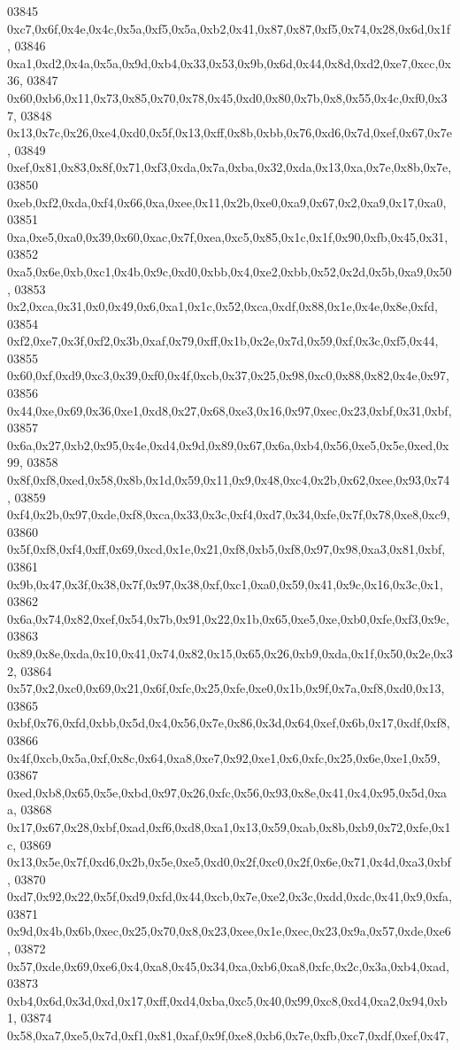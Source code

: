 \begin{DoxyCode}
03845   0xc7,0x6f,0x4e,0x4c,0x5a,0xf5,0x5a,0xb2,0x41,0x87,0x87,0xf5,0x74,0x28,0x6d,0x1f,
03846   0xa1,0xd2,0x4a,0x5a,0x9d,0xb4,0x33,0x53,0x9b,0x6d,0x44,0x8d,0xd2,0xe7,0xcc,0x36,
03847   0x60,0xb6,0x11,0x73,0x85,0x70,0x78,0x45,0xd0,0x80,0x7b,0x8,0x55,0x4c,0xf0,0x37,
03848   0x13,0x7c,0x26,0xe4,0xd0,0x5f,0x13,0xff,0x8b,0xbb,0x76,0xd6,0x7d,0xef,0x67,0x7e,
03849   0xef,0x81,0x83,0x8f,0x71,0xf3,0xda,0x7a,0xba,0x32,0xda,0x13,0xa,0x7e,0x8b,0x7e,
03850   0xeb,0xf2,0xda,0xf4,0x66,0xa,0xee,0x11,0x2b,0xe0,0xa9,0x67,0x2,0xa9,0x17,0xa0,
03851   0xa,0xe5,0xa0,0x39,0x60,0xac,0x7f,0xea,0xc5,0x85,0x1c,0x1f,0x90,0xfb,0x45,0x31,
03852   0xa5,0x6e,0xb,0xc1,0x4b,0x9c,0xd0,0xbb,0x4,0xe2,0xbb,0x52,0x2d,0x5b,0xa9,0x50,
03853   0x2,0xca,0x31,0x0,0x49,0x6,0xa1,0x1c,0x52,0xca,0xdf,0x88,0x1e,0x4e,0x8e,0xfd,
03854   0xf2,0xe7,0x3f,0xf2,0x3b,0xaf,0x79,0xff,0x1b,0x2e,0x7d,0x59,0xf,0x3c,0xf5,0x44,
03855   0x60,0xf,0xd9,0xc3,0x39,0xf0,0x4f,0xcb,0x37,0x25,0x98,0xc0,0x88,0x82,0x4e,0x97,
03856   0x44,0xe,0x69,0x36,0xe1,0xd8,0x27,0x68,0xe3,0x16,0x97,0xec,0x23,0xbf,0x31,0xbf,
03857   0x6a,0x27,0xb2,0x95,0x4e,0xd4,0x9d,0x89,0x67,0x6a,0xb4,0x56,0xe5,0x5e,0xed,0x99,
03858   0x8f,0xf8,0xed,0x58,0x8b,0x1d,0x59,0x11,0x9,0x48,0xc4,0x2b,0x62,0xee,0x93,0x74,
03859   0xf4,0x2b,0x97,0xde,0xf8,0xca,0x33,0x3c,0xf4,0xd7,0x34,0xfe,0x7f,0x78,0xe8,0xc9,
03860   0x5f,0xf8,0xf4,0xff,0x69,0xcd,0x1e,0x21,0xf8,0xb5,0xf8,0x97,0x98,0xa3,0x81,0xbf,
03861   0x9b,0x47,0x3f,0x38,0x7f,0x97,0x38,0xf,0xc1,0xa0,0x59,0x41,0x9c,0x16,0x3c,0x1,
03862   0x6a,0x74,0x82,0xef,0x54,0x7b,0x91,0x22,0x1b,0x65,0xe5,0xe,0xb0,0xfe,0xf3,0x9c,
03863   0x89,0x8e,0xda,0x10,0x41,0x74,0x82,0x15,0x65,0x26,0xb9,0xda,0x1f,0x50,0x2e,0x32,
03864   0x57,0x2,0xc0,0x69,0x21,0x6f,0xfc,0x25,0xfe,0xe0,0x1b,0x9f,0x7a,0xf8,0xd0,0x13,
03865   0xbf,0x76,0xfd,0xbb,0x5d,0x4,0x56,0x7e,0x86,0x3d,0x64,0xef,0x6b,0x17,0xdf,0xf8,
03866   0x4f,0xcb,0x5a,0xf,0x8c,0x64,0xa8,0xe7,0x92,0xe1,0x6,0xfc,0x25,0x6e,0xe1,0x59,
03867   0xed,0xb8,0x65,0x5e,0xbd,0x97,0x26,0xfc,0x56,0x93,0x8e,0x41,0x4,0x95,0x5d,0xaa,
03868   0x17,0x67,0x28,0xbf,0xad,0xf6,0xd8,0xa1,0x13,0x59,0xab,0x8b,0xb9,0x72,0xfe,0x1c,
03869   0x13,0x5e,0x7f,0xd6,0x2b,0x5e,0xe5,0xd0,0x2f,0xc0,0x2f,0x6e,0x71,0x4d,0xa3,0xbf,
03870   0xd7,0x92,0x22,0x5f,0xd9,0xfd,0x44,0xcb,0x7e,0xe2,0x3c,0xdd,0xdc,0x41,0x9,0xfa,
03871   0x9d,0x4b,0x6b,0xec,0x25,0x70,0x8,0x23,0xee,0x1e,0xec,0x23,0x9a,0x57,0xde,0xe6,
03872   0x57,0xde,0x69,0xe6,0x4,0xa8,0x45,0x34,0xa,0xb6,0xa8,0xfc,0x2c,0x3a,0xb4,0xad,
03873   0xb4,0x6d,0x3d,0xd,0x17,0xff,0xd4,0xba,0xc5,0x40,0x99,0xc8,0xd4,0xa2,0x94,0xb1,
03874   0x58,0xa7,0xe5,0x7d,0xf1,0x81,0xaf,0x9f,0xe8,0xb6,0x7e,0xfb,0xc7,0xdf,0xef,0x47,

\end{DoxyCode}

